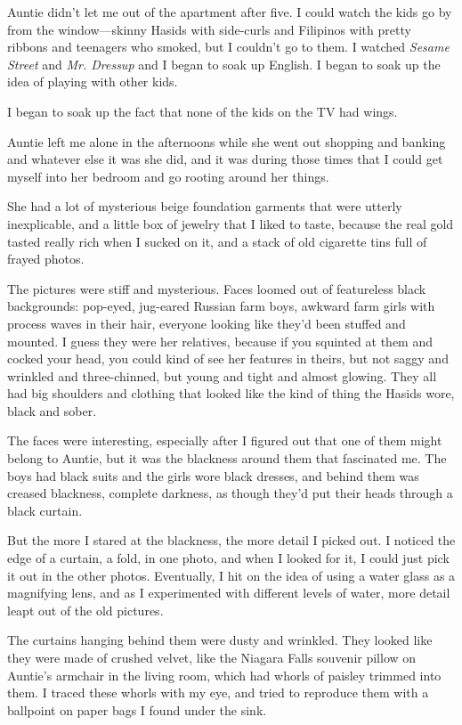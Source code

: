 Auntie didn't let me out of the apartment after five.  I could watch
the kids go by from the window---skinny Hasids with side-curls and
Filipinos with pretty ribbons and teenagers who smoked, but I couldn't
go to them.  I watched \textit{Sesame Street} and \textit{Mr. 
Dressup} and I began to soak up English.  I began to soak up the idea
of playing with other kids.

I began to soak up the fact that none of the kids on the TV had wings.

Auntie left me alone in the afternoons while she went out shopping and
banking and whatever else it was she did, and it was during those
times that I could get myself into her bedroom and go rooting around
her things.

She had a lot of mysterious beige foundation garments that were
utterly inexplicable, and a little box of jewelry that I liked to
taste, because the real gold tasted really rich when I sucked on it,
and a stack of old cigarette tins full of frayed photos.

The pictures were stiff and mysterious.  Faces loomed out of
featureless black backgrounds:  pop-eyed, jug-eared Russian farm boys,
awkward farm girls with process waves in their hair, everyone looking
like they'd been stuffed and mounted.  I guess they were her
relatives, because if you squinted at them and cocked your head, you
could kind of see her features in theirs, but not saggy and wrinkled
and three-chinned, but young and tight and almost glowing.  They all
had big shoulders and clothing that looked like the kind of thing the
Hasids wore, black and sober.

The faces were interesting, especially after I figured out that one of
them might belong to Auntie, but it was the blackness around them that
fascinated me.  The boys had black suits and the girls wore black
dresses, and behind them was creased blackness, complete darkness, as
though they'd put their heads through a black curtain.

But the more I stared at the blackness, the more detail I picked out. 
I noticed the edge of a curtain, a fold, in one photo, and when I
looked for it, I could just pick it out in the other photos. 
Eventually, I hit on the idea of using a water glass as a magnifying
lens, and as I experimented with different levels of water, more
detail leapt out of the old pictures.

The curtains hanging behind them were dusty and wrinkled.  They looked
like they were made of crushed velvet, like the Niagara Falls souvenir
pillow on Auntie's armchair in the living room, which had whorls of
paisley trimmed into them.  I traced these whorls with my eye, and
tried to reproduce them with a ballpoint on paper bags I found under
the sink.

